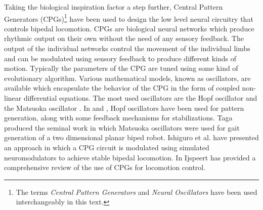 \documentclass[12pt,twoside]{article}
\theoremstyle{plain}
\theoremstyle{definition}
\theoremstyle{remark}
\newcommand{\forceindent}{\leavevmode{\parindent=2em\indent}}
\begin{document}
\forceindent Taking the biological inspiration factor a step further, Central Pattern Generators (CPGs)\footnote{The terms \textit{Central Pattern Generators} and \textit{Neural Oscillators} have been used interchangeably in this text.} have been used to design the low level neural circuitry that controls bipedal locomotion. CPGs are biological neural networks which produce rhythmic output on their own without the need of any sensory feedback. The output of the individual networks control the movement of the individual limbs and can be modulated using sensory feedback to produce different kinds of motion. Typically the parameters of the CPG are tuned using some kind of evolutionary algorithm. Various mathematical models, known as oscillators, are available which encapsulate the behavior of the CPG in the form of coupled non-linear differential equations. The most used oscillators are the Hopf oscillator \cite{Righetti2006} and the Matsuoka oscillator \cite{Matsuoka1985,Matsuoka1987}. In \cite{Righetti2006} and \cite{Kieboom2009}, Hopf oscillators have been used for pattern generation, along with some feedback mechanisms for stabilizations. Taga \cite{Taga1991} produced the seminal work in which Matsuoka oscillators were used for gait generation of a two dimensional planar biped robot. Ishiguro et al. \cite{Ishiguro2003} have presented an approach in which a CPG circuit is modulated using simulated neuromodulators to achieve stable bipedal locomotion. In \cite{Ijspeert2008} Ijspeert has provided a comprehensive review of the use of CPGs for locomotion control.
\end{document}
